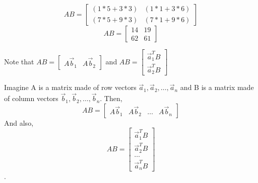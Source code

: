 \begin{enumerate}
{  $$AB = \begin{bmatrix} (1*5 + 3*3) & (1*1 + 3*6)\\(7*5 + 9*3) & (7*1 + 9*6) \end{bmatrix}$$
  $$AB = \begin{bmatrix} 14 & 19 \\ 62 & 61 \end{bmatrix}$$

  Note that $AB = \begin{bmatrix} A\vec{b}_1 & A\vec{b}_2 \end{bmatrix}$ and $AB = \begin{bmatrix} \vec{a}_1^T B \\ \vec{a}_2^T B \end{bmatrix}$

  Imagine A is a matrix made of row vectors $\vec{a}_1, \vec{a}_2, \dots, \vec{a}_n$ and B is a matrix made of column vectors $\vec{b}_1, \vec{b}_2, \dots, \vec{b}_n$. Then, $$AB = \begin{bmatrix} A\vec{b}_1 & A\vec{b}_2 & \dots & A\vec{b}_n \end{bmatrix}$$ And also, $$AB = \begin{bmatrix} \vec{a}_1^T B \\ \vec{a}_2^T B \\ \dots \\ \vec{a}_n^T B \end{bmatrix}$$.
}

\end{enumerate}
\newpage